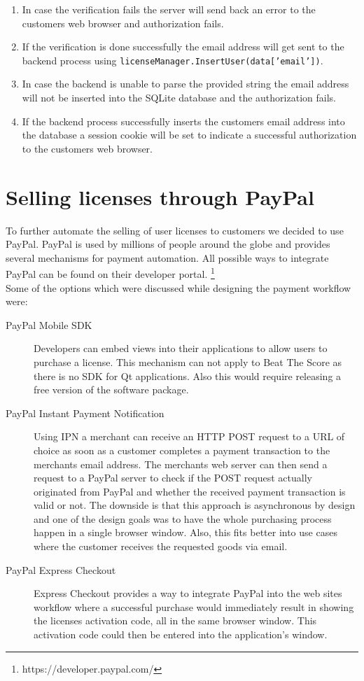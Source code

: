 \begin{enumerate}
\item In case the verification fails the server will send back an error to the customers web browser and authorization fails.
\item If the verification is done successfully the email address will get sent to the backend process using {\tt licenseManager.InsertUser(data['email'])}. 
\item In case the backend is unable to parse the provided string the email address will not be inserted into the SQLite database and the authorization fails.
\item If the backend process successfully inserts the customers email address into the database a session cookie will be set to indicate a successful authorization to the customers web browser. 
\end{enumerate}

\section{Selling licenses through PayPal}
To further automate the selling of user licenses to customers we decided to use PayPal. PayPal is used by millions of people around the globe and provides several mechanisms for payment automation. All possible ways to integrate PayPal can be found on their developer portal. \footnote{\label{foot:3}https://developer.paypal.com/}
\\
Some of the options which were discussed while designing the payment workflow were:

\begin{description}
\item [PayPal Mobile SDK] Developers can embed views into their applications to allow users to purchase a license. This mechanism can not apply to Beat The Score as there is no SDK for Qt applications. Also this would require releasing a free version of the software package. \hfill \\
\item [PayPal Instant Payment Notification] Using IPN a merchant can receive an HTTP POST request to a URL of choice as soon as a customer completes a payment transaction to the merchants email address. The merchants web server can then send a request to a PayPal server to check if the POST request actually originated from PayPal and whether the received payment transaction is valid or not. The downside is that this approach is asynchronous by design and one of the design goals was to have the whole purchasing process happen in a single browser window. Also, this fits better into use cases where the customer receives the requested goods via email. \hfill \\
\item [PayPal Express Checkout] Express Checkout provides a way to integrate PayPal into the web sites workflow where a successful purchase would immediately result in showing the licenses activation code, all in the same browser window. This activation code could then be entered into the application's window. \hfill \\
\end{description}

